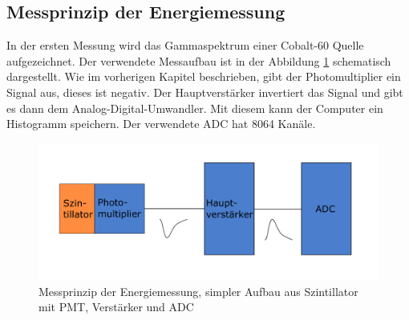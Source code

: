 \documentclass[12pt,a4paper,ngerman]{report}
\begin{document}
	\subsection{Messprinzip der Energiemessung}\label{ch:EnergieMessung}
	In der ersten Messung wird das Gammaspektrum einer Cobalt-60 Quelle aufgezeichnet. Der verwendete Messaufbau ist in der Abbildung \ref{img:EnergieAufbau} schematisch dargestellt. Wie im vorherigen Kapitel beschrieben, gibt der Photomultiplier ein Signal aus, dieses ist negativ. Der Hauptverstärker invertiert das Signal und gibt es dann dem Analog-Digital-Umwandler. Mit diesem kann der Computer ein Histogramm speichern. Der verwendete ADC hat 8064 Kanäle.
	\begin{figure}[ht]
		\centering
		\includegraphics[width=\textwidth]{Bilder/Energiemessung.pdf}		
		\caption{Messprinzip der Energiemessung, simpler Aufbau aus Szintillator mit PMT, Verstärker und ADC}
		\label{img:EnergieAufbau}
	\end{figure}
\end{document}
